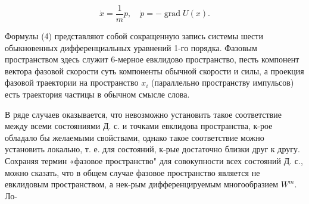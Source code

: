 \documentclass[10pt]{article}
\begin{document}
\[

\dot{x}=\frac{1}{m} p, \quad \dot{p}=-\operatorname{grad} U(x) .

\]



Формулы (4) представляют собой сокращенную запись системы шести обыкновенных дифференциальных уравнений 1-го порядка. Фазовым пространством здесь служит 6-мерное евклидово пространство, песть компонент вектора фазовой скорости суть компоненты обычной скорости и силы, а проекция фазовой траектории на пространство $x_{i}$ (параллельно пространству импульсов) есть траектория частицы в обычном смысле слова.



В ряде случаев оказывается, что невозможно установить такое соответствие между всеми состояниями Д. с. и точками евклидова пространства, к-рое обладало бы желаемыми свойствами, однако такое соответствие можно установить локально, т. е. для состояний, к-рые достаточно близки друг к другу. Сохраняя термин «фазовое пространство" для совокупности всех состояний Д. с., можно сказать, что в общем случае фазовое пространство является не евклидовым пространством, а нек-рым дифференцируемым многообразием $W^{m}$. Ло-
\end{document}
